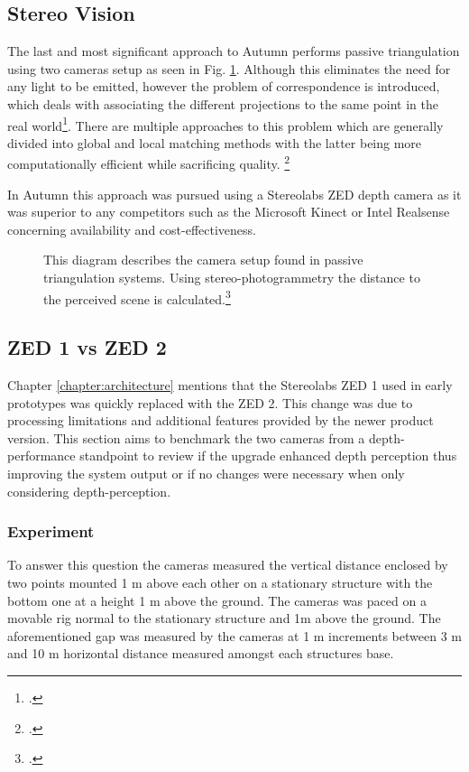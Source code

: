 \subsection{Stereo Vision}
The last and most significant approach to Autumn performs passive triangulation using two cameras setup as seen in Fig. \ref{fig:passiveTriangulation}. Although this eliminates the need for any light to be emitted, however the problem of correspondence is introduced, which deals with associating the different projections to the same point in the real world\footcite{ng2019StereoCorrespondence}. There are multiple approaches to this problem which are generally divided into global and local matching methods with the latter being more computationally efficient while sacrificing quality. \footcite{do2019review}

In Autumn this approach was pursued using a Stereolabs ZED depth camera as it was superior to any competitors such as the Microsoft Kinect or Intel Realsense concerning availability and cost-effectiveness. 

\begin{figure}
	\centering
	
	\caption{
		This diagram describes the camera setup found in passive triangulation systems. Using stereo-photogrammetry the distance to the perceived scene is calculated.\footcite{altuntas2021triangulation}
	}
	\label{fig:passiveTriangulation}
\end{figure}

\subsection{ZED 1 vs ZED 2}
Chapter \ref{chapter:architecture} mentions that the Stereolabs ZED 1 used in early prototypes was quickly replaced with the ZED 2. This change was due to processing limitations and additional features provided by the newer product version.
This section aims to benchmark the two cameras from a depth-performance standpoint to review if the upgrade enhanced depth perception thus improving the system output or if no changes were necessary when only considering depth-perception.

\subsubsection{Experiment}
To answer this question the cameras measured the vertical distance enclosed by two points mounted 1 m above each other on a stationary structure with the bottom one at a height 1 m above the ground. 
The cameras was paced on a movable rig normal to the stationary structure and 1m above the ground.  The aforementioned gap was measured by the cameras at 1 m increments between 3 m and 10 m horizontal distance measured amongst each structures base. 

